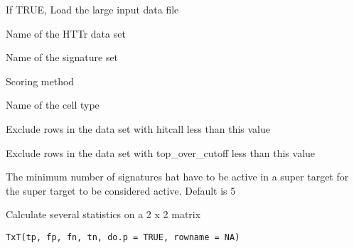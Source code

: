 \documentclass[letterpaper]{book}
\begin{document}
\begin{Arguments}
\begin{ldescription}
\item[\code{do.load}] If TRUE, Load the large input data file

\item[\code{dataset}] Name of the HTTr data set

\item[\code{sigset}] Name of the signature set

\item[\code{method}] Scoring method

\item[\code{celltype}] Name of the cell type

\item[\code{hccut}] Exclude rows in the data set with hitcall less than this value

\item[\code{tccut}] Exclude rows in the data set with top\_over\_cutoff less than this value

\item[\code{cutoff}] The minimum number of signatures hat have to be active in a super
target for the super target to be considered active. Default is 5
\end{ldescription}
\end{Arguments}
%
\begin{Description}\relax
Calculate several statistics on a 2 x 2 matrix
\end{Description}
%
\begin{Usage}
\begin{verbatim}
TxT(tp, fp, fn, tn, do.p = TRUE, rowname = NA)
\end{verbatim}
\end{Usage}
%
\end{document}
